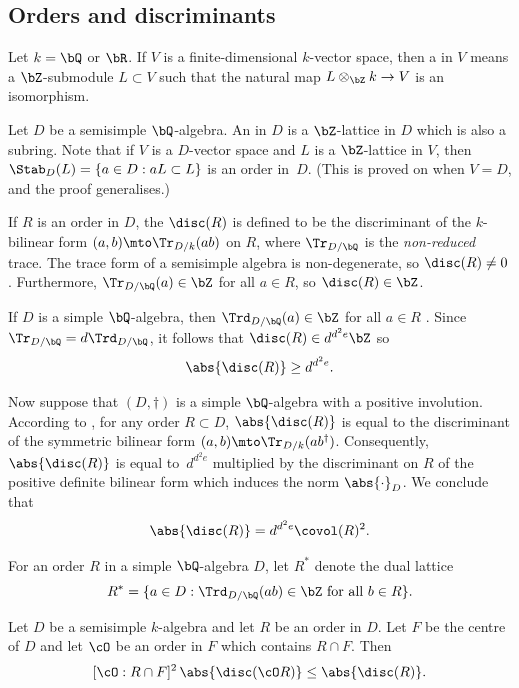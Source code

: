 \subsection{Orders and discriminants}\label{sec:orders}

Let $k = \bQ$ or $\bR$.
If $V$ is a finite-dimensional $k$\nobreakdash-vector space, then a  in $V$ means a $\bZ$-submodule $L \subset V$ such that the natural map $L \otimes_\bZ k \to V$ is an isomorphism.

Let $D$ be a semisimple $\bQ$-algebra.
An  in $D$ is a $\bZ$-lattice in $D$ which is also a subring.
Note that if $V$ is a $D$-vector space and $L$ is a $\bZ$-lattice in $V$, then $\Stab_D(L) = \{ a \in D : aL \subset L \}$ is an order in~$D$. (This is proved on \cite[p.\,109]{Rei75} when $V=D$, and the proof generalises.)

If $R$ is an order in $D$, the  $\disc(R)$ is defined to be the discriminant of the $k$-bilinear form $(a,b) \mto \Tr_{D/k}(ab)$ on $R$, where $\Tr_{D/\bQ}$ is the \emph{non-reduced} trace.
The trace form of a semisimple algebra is non-degenerate, so $\disc(R) \neq 0$.
Furthermore, $\Tr_{D/\bQ}(a) \in \bZ$ for all $a \in R$, so $\disc(R) \in \bZ$.

If $D$ is a simple $\bQ$-algebra, then $\Trd_{D/\bQ}(a) \in \bZ$ for all $a \in R$ \cite[Th.\,10.1]{Rei75}.
Since $\Tr_{D/\bQ} = d \Trd_{D/\bQ}$, it follows that $\disc(R) \in d^{d^2e} \bZ$ so
\begin{equation} \label{eqn:disc-lower-bound}
\abs{\disc(R)} \geq d^{d^2e}.
\end{equation}

Now suppose that $(D,\dag)$ is a simple $\bQ$-algebra with a positive involution.
According to \cite[Lem.\,5.6]{QRTUI}, for any order $R \subset D$, $\abs{\disc(R)}$ is equal to the discriminant of the symmetric bilinear form $(a,b) \mto \Tr_{D/k}(ab^\dag)$.
Consequently, $\abs{\disc(R)}$ is equal to~$d^{d^2e}$ multiplied by the discriminant on $R$ of the positive definite bilinear form which induces the norm $\abs{\cdot}_D$.
We conclude that
\begin{equation} \label{eqn:disc-covol}
\abs{\disc(R)} = d^{d^2e}\covol(R)^2.
\end{equation}

For an order $R$ in a simple $\bQ$-algebra $D$, let $R^*$ denote the dual lattice
\[
R^* = \{ a \in D : \Trd_{D/\bQ}(ab) \in \bZ \text{ for all } b \in R \}.
\]

\begin{lemma} \label{index-RcapF}
Let $D$ be a semisimple $k$-algebra and let $R$ be an order in $D$.
Let $F$ be the centre of $D$ and let $\cO$ be an order in $F$ which contains $R \cap F$.
Then
\[
[\cO:R \cap F]^2 \, \abs{\disc(\cO R)} \leq \abs{\disc(R)}.
\]
\end{lemma}

